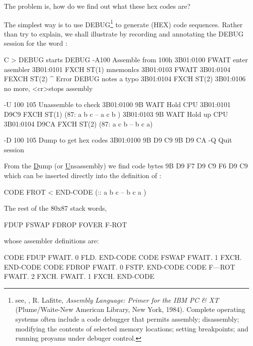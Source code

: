 {{{The problem is, how do we find out what these hex codes are?

The simplest way is to use DEBUG\footnote{see, \eg, R. Lafitte, \textit{Assembly Language: Primer for the IBM PC & XT} (Plume/Waite-New American Library, New York, 1984). Complete operating systems often include a code debugger that permits assembly; disassembly; modifying the contents of selected memory locations; setting breakpoints; and running proyams under debuger control.} to generate (HEX) code sequences. Rather than try to explain, we shall illustrate by recording and annotating the DEBUG session for the word :

\begin{listing}
    C > DEBUG               starts DEBUG
    -A100                   Assemble from 100h
    3B01:0100 FWAIT         enter asembler
    3B01:0101 FXCH ST(1)    mnemonlcs
    3B01:0103 FWAIT
    3B01:0104 FEXCH ST(2)
             ^ Error        DEBUG notes a typo
    3B01:0104 FXCH ST(2)
    3B01:0106       no more, <cr>stops assembly
    
    -U 100 105              Unassemble to check
    3B01:0100 9B    WAIT    Hold CPU
    3B01:0101 D9C9  FXCH    ST(1)
                            (87: a b c -- a c b )
    3B01:0103 9B    WAIT    Hold up CPU
    3B01:0104 D9CA  FXCH    ST(2)
                            (87: a c b -- b c a)

    -D 100 105              Dump to get hex codes
    3B01:0100 9B D9 C9 9B D9 CA
    -Q                      Quit session
\end{listing}

From the \underline{D}ump (or \underline{U}nsassembly) we find code bytes 9B D9 F7 D9 C9 F6 D9 C9 which can be inserted directly into the definition of :

\begin{listing}
    CODE FROT <%
        END-CODE (:: a b c -- b c a )
\end{listing}
The rest of the 80x87 stack words,
\begin{listing}
    FDUP FSWAP FDROP FOVER F-ROT
\end{listing}

whose assembler definitions are:
\begin{listing}
    CODE    FDUP      FWAIT. 0  FLD.  END-CODE
    CODE    FSWAP     FWAIT. 1 FXCH.  END-CODE
    CODE    FDROP     FWAIT. 0 FSTP.  END-CODE
    CODE    F—ROT   FWAIT. 2 FXCH.
            FWAIT.  1 FXCH.           END-CODE
\end{listing}

}}}
